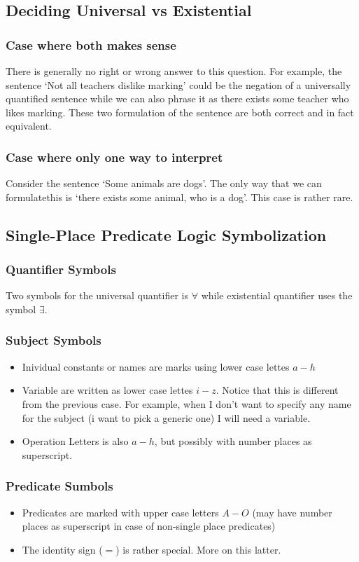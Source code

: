 \documentclass[10pt]{article}
\begin{document}
\subsection{Deciding Universal vs Existential}
\subsubsection{Case where both makes sense}
There is generally no right or wrong answer to this question. For example, the sentence `Not all teachers dislike marking' could be the negation of a universally quantified sentence while we can also phrase it as there exists some teacher who likes marking. These two formulation of the sentence are both correct and in fact equivalent. 
\subsubsection{Case where only one way to interpret} 
Consider the sentence `Some animals are dogs'. The only way that we can formulatethis is `there exists some animal, who is a dog'. This case is rather rare.

\subsection{Single-Place Predicate Logic Symbolization}
\subsubsection{Quantifier Symbols}
Two symbols for the universal quantifier is $\forall$ while existential quantifier uses the symbol $\exists$. 
\subsubsection{Subject Symbols}
\begin{itemize}
    \item Inividual constants or names are marks using lower case lettes $a-h$
    \item Variable are written as lower case lettes $i-z$. Notice that this is different from the previous case. For example, when I don't want to specify any name for the subject (i want to pick a generic one) I will need a variable.
    \item Operation Letters is also $a-h$, but possibly with number places as superscript.
\end{itemize}

\subsubsection{Predicate Sumbols}
\begin{itemize}
    \item Predicates are marked with upper case letters $A-O$ (may have number places as superscript in case of non-single place predicates)
    \item The identity sign ($=$) is rather special. More on this latter.
\end{itemize}
\end{document}
